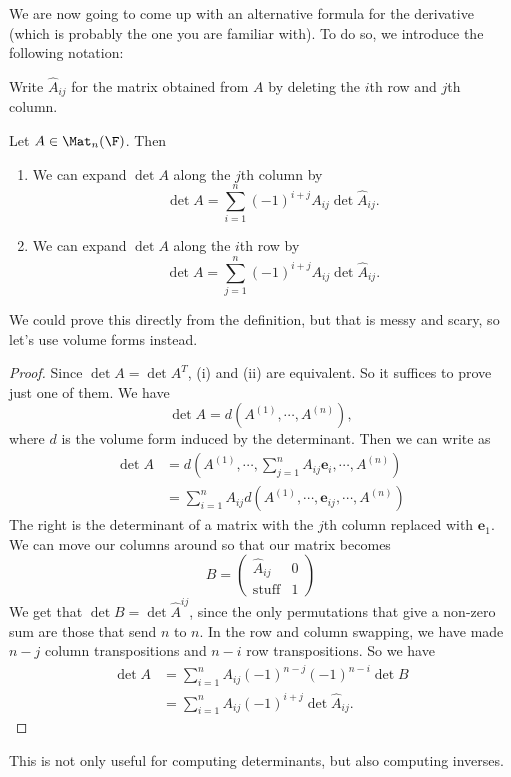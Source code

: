 \documentclass[a4paper]{article}
\begin{document}
We are now going to come up with an alternative formula for the derivative (which is probably the one you are familiar with). To do so, we introduce the following notation:
\begin{notation}
  Write $\hat{A}_{ij}$ for the matrix obtained from $A$ by deleting the $i$th row and $j$th column.
\end{notation}

\begin{lemma}
  Let $A \in \Mat_n(\F)$. Then
  \begin{enumerate}
    \item We can expand $\det A$ along the $j$th column by
      \[
        \det A = \sum_{i = 1}^n (-1)^{i + j} A_{ij} \det \hat{A}_{ij}.
      \]
    \item We can expand $\det A$ along the $i$th row by
      \[
        \det A = \sum_{j = 1}^n (-1)^{i + j} A_{ij} \det \hat{A}_{ij}.
      \]
  \end{enumerate}
\end{lemma}
We could prove this directly from the definition, but that is messy and scary, so let's use volume forms instead.

\begin{proof}
  Since $\det A = \det A^T$, (i) and (ii) are equivalent. So it suffices to prove just one of them. We have
  \[
    \det A = d(A^{(1)}, \cdots, A^{(n)}),
  \]
  where $d$ is the volume form induced by the determinant. Then we can write as
  \begin{align*}
    \det A &= d\left(A^{(1)}, \cdots, \sum_{j = 1}^n A_{ij} \mathbf{e}_i, \cdots, A^{(n)}\right)\\
    &= \sum_{i = 1}^n A_{ij} d(A^{(1)}, \cdots, \mathbf{e}_{ij}, \cdots, A^{(n)})
  \end{align*}
  The right is the determinant of a matrix with the $j$th column replaced with $\mathbf{e}_1$. We can move our columns around so that our matrix becomes
  \[
    B =
    \begin{pmatrix}
      \hat{A}_{ij} & 0\\
      \mathrm{stuff} & 1
    \end{pmatrix}
  \]
  We get that $\det B = \det \hat{A}^{ij}$, since the only permutations that give a non-zero sum are those that send $n$ to $n$. In the row and column swapping, we have made $n - j$ column transpositions and $n - i$ row transpositions. So we have
  \begin{align*}
    \det A &= \sum_{i = 1}^n A_{ij} (-1)^{n - j} (-1)^{n - i}\det B\\
    &= \sum_{i = 1}^n A_{ij} (-1)^{i + j} \det \hat{A}_{ij}.
  \end{align*}
\end{proof}
This is not only useful for computing determinants, but also computing inverses.
\end{document}

